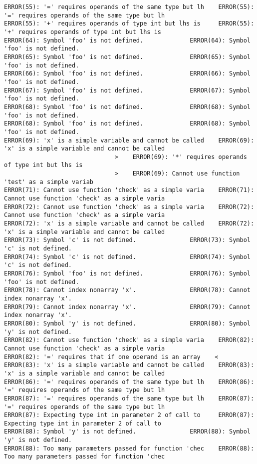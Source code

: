 \documentclass[12pt]{book}
\begin{document}
\begin{lstlisting}
ERROR(55): '=' requires operands of the same type but lh	ERROR(55): '=' requires operands of the same type but lh
ERROR(55): '+' requires operands of type int but lhs is 	ERROR(55): '+' requires operands of type int but lhs is 
ERROR(64): Symbol 'foo' is not defined.				ERROR(64): Symbol 'foo' is not defined.
ERROR(65): Symbol 'foo' is not defined.				ERROR(65): Symbol 'foo' is not defined.
ERROR(66): Symbol 'foo' is not defined.				ERROR(66): Symbol 'foo' is not defined.
ERROR(67): Symbol 'foo' is not defined.				ERROR(67): Symbol 'foo' is not defined.
ERROR(68): Symbol 'foo' is not defined.				ERROR(68): Symbol 'foo' is not defined.
ERROR(68): Symbol 'foo' is not defined.				ERROR(68): Symbol 'foo' is not defined.
ERROR(69): 'x' is a simple variable and cannot be called	ERROR(69): 'x' is a simple variable and cannot be called
							   >	ERROR(69): '*' requires operands of type int but lhs is 
							   >	ERROR(69): Cannot use function 'test' as a simple variab
ERROR(71): Cannot use function 'check' as a simple varia	ERROR(71): Cannot use function 'check' as a simple varia
ERROR(72): Cannot use function 'check' as a simple varia	ERROR(72): Cannot use function 'check' as a simple varia
ERROR(72): 'x' is a simple variable and cannot be called	ERROR(72): 'x' is a simple variable and cannot be called
ERROR(73): Symbol 'c' is not defined.				ERROR(73): Symbol 'c' is not defined.
ERROR(74): Symbol 'c' is not defined.				ERROR(74): Symbol 'c' is not defined.
ERROR(76): Symbol 'foo' is not defined.				ERROR(76): Symbol 'foo' is not defined.
ERROR(78): Cannot index nonarray 'x'.				ERROR(78): Cannot index nonarray 'x'.
ERROR(79): Cannot index nonarray 'x'.				ERROR(79): Cannot index nonarray 'x'.
ERROR(80): Symbol 'y' is not defined.				ERROR(80): Symbol 'y' is not defined.
ERROR(82): Cannot use function 'check' as a simple varia	ERROR(82): Cannot use function 'check' as a simple varia
ERROR(82): '=' requires that if one operand is an array    <
ERROR(83): 'x' is a simple variable and cannot be called	ERROR(83): 'x' is a simple variable and cannot be called
ERROR(86): '=' requires operands of the same type but lh	ERROR(86): '=' requires operands of the same type but lh
ERROR(87): '=' requires operands of the same type but lh	ERROR(87): '=' requires operands of the same type but lh
ERROR(87): Expecting type int in parameter 2 of call to 	ERROR(87): Expecting type int in parameter 2 of call to 
ERROR(88): Symbol 'y' is not defined.				ERROR(88): Symbol 'y' is not defined.
ERROR(88): Too many parameters passed for function 'chec	ERROR(88): Too many parameters passed for function 'chec

\end{lstlisting}
\end{document}
